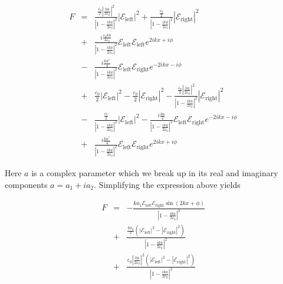 \begin{eqnarray}
F&=&\frac{\frac{\varepsilon_{0}}{2}\left|\frac{k a}{2\varepsilon_{0}}\right|^{2}}{\left|1-\frac{ika}{2\varepsilon_{0}}\right|^{2}}\left|\mathcal{E}_{\mathrm{left}}\right|^{2}+\frac{\frac{\varepsilon_{0}}{2}}{\left|1-\frac{ika}{2\varepsilon_{0}}\right|^{2}}\left|\mathcal{E}_{\mathrm{right}}\right|^{2} \nonumber \\
&+&\frac{i\frac{\varepsilon_{0}ka}{4\varepsilon_{0}}}{\left|1-\frac{ika}{2\varepsilon_{0}}\right|^{2}}\mathcal{E}_{\mathrm{left}}\mathcal{E}_{\mathrm{left}}e^{2ikx+i\phi}\nonumber \\
&-&\frac{i\frac{ka^{*}}{4}}{\left|1-\frac{ika}{2\varepsilon_{0}}\right|^{2}}\mathcal{E}_{\mathrm{left}}\mathcal{E}_{\mathrm{right}}e^{-2ikx-i\phi} \nonumber \\
&+&\frac{\varepsilon_{0}}{2}\left|\mathcal{E}_{\mathrm{left}}\right|^{2}-\frac{\varepsilon_{0}}{2}\left|\mathcal{E}_{\mathrm{right}}\right|^{2}-\frac{\frac{\varepsilon_{0}}{2}\left|\frac{ka}{2\varepsilon_{0}}\right|^{2}}{\left|1-\frac{ika}{2\varepsilon_{0}}\right|^{2}}\left|\mathcal{E}_{\mathrm{right}}\right|^{2} \nonumber \\
&-&\frac{\frac{\varepsilon_{0}}{2}}{\left|1-\frac{ika}{2\varepsilon_{0}}\right|^{2}}\left|\mathcal{E}_{\mathrm{left}}\right|^{2}-\frac{i\frac{ka}{4}}{\left|1-\frac{ika}{2\varepsilon_{0}}\right|^{2}}\mathcal{E}_{\mathrm{left}}\mathcal{E}_{\mathrm{right}}e^{-2ikx-i\phi} \nonumber \\
&+&\frac{i\frac{ka^{*}}{4}}{\left|1-\frac{ika}{2\varepsilon_{0}}\right|^{2}}\mathcal{E}_{\mathrm{left}}\mathcal{E}_{\mathrm{right}}e^{2ikx+i\phi}
\label{f1}
\end{eqnarray}

Here $a$ is a complex parameter which we break up in its real and imaginary components $a=a_{1}+ia_{2}$. Simplifying the expression above yields

\begin{eqnarray}
F &=&-\frac{ka_{1}\mathcal{E}_{\mathrm{left}}\mathcal{E}_{\mathrm{right}}\sin\left(2kx+\phi\right)}{\left|1-\frac{ika}{2\varepsilon_{0}}\right|^{2}} \nonumber \\
&+&\frac{\frac{ka_{2}}{2}\left(\left|\mathcal{E}_{\mathrm{left}}\right|^{2}-\left|\mathcal{E}_{\mathrm{right}}\right|^{2}\right)}{\left|1-\frac{ika}{2\varepsilon_{0}}\right|^{2}} \nonumber \\
&+&\frac{\varepsilon_{0}\left|\frac{ka}{2\varepsilon_{0}}\right|^{2}\left(\left|\mathcal{E}_{\mathrm{left}}\right|^{2}-\left|\mathcal{E}_{\mathrm{right}}\right|^{2}\right)}{\left|1-\frac{ika}{2\varepsilon_{0}}\right|^{2}}
\label{f2}
\end{eqnarray}




